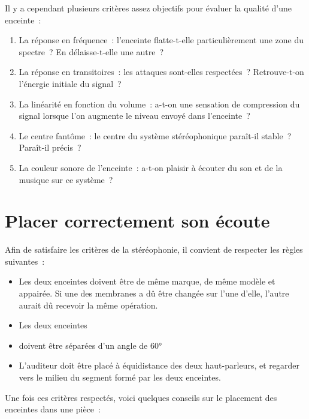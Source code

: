 \documentclass[
]{book}
\providecommand{\tightlist}{%
  \setlength{\itemsep}{0pt}\setlength{\parskip}{0pt}}
\begin{document}
Il y a cependant plusieurs critères assez objectifs pour évaluer la qualité d'une enceinte~:

\begin{enumerate}
\def\labelenumi{\arabic{enumi}.}
\tightlist
\item
  La réponse en fréquence~: l'enceinte flatte-t-elle particulièrement une zone du spectre~? En délaisse-t-elle une autre~?
\item
  La réponse en transitoires~: les attaques sont-elles respectées~? Retrouve-t-on l'énergie initiale du signal~?
\item
  La linéarité en fonction du volume~: a-t-on une sensation de compression du signal lorsque l'on augmente le niveau envoyé dans l'enceinte~?
\item
  Le centre fantôme~: le centre du système stéréophonique paraît-il stable~? Paraît-il précis~?
\item
  La couleur sonore de l'enceinte~: a-t-on plaisir à écouter du son et de la musique sur ce système~?
\end{enumerate}

\hypertarget{placer-correctement-son-uxe9coute}{%
\section{Placer correctement son écoute}\label{placer-correctement-son-uxe9coute}}

Afin de satisfaire les critères de la stéréophonie, il convient de respecter les règles suivantes~:

\begin{itemize}
\tightlist
\item
  Les deux enceintes doivent être de même marque, de même modèle et appairée. Si une des membranes a dû être changée sur l'une d'elle, l'autre aurait dû recevoir la même opération.
\item
  Les deux enceintes
\item
  doivent être séparées d'un angle de 60°
\item
  L'auditeur doit être placé à équidistance des deux haut-parleurs, et regarder vers le milieu du segment formé par les deux enceintes.
\end{itemize}

Une fois ces critères respectés, voici quelques conseils sur le placement des enceintes dans une pièce~:
\end{document}
